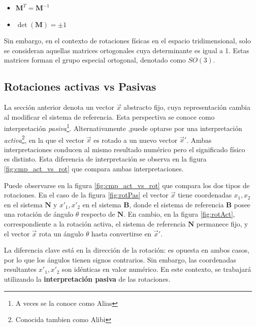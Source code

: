 \begin{itemize}
	\item $\mathbf{M}^T = \mathbf{M}^{-1}$
	\item $\det( \mathbf{M}) = \pm 1$ 
\end{itemize}
Sin embargo, en el contexto de rotaciones físicas en el espacio tridimensional, solo se consideran aquellas matrices ortogonales cuya determinante es igual a 1. Estas matrices forman el grupo especial ortogonal, denotado como $SO(3)$. 

\subsection{Rotaciones activas vs Pasivas}
La sección anterior denota un vector $\vec{x}$ abstracto fijo,  cuya representación cambia al modificar el sistema de referencia. Esta perspectiva se conoce como interpretación \textit{pasiva}\footnote{A veces se la conoce como Alias}. Alternativamente ,puede optarse por una interpretación  \textit{activa}\footnote{Conocida tambien como Alibi}, 
en la que el vector $\vec{x}$ es rotado a un nuevo vector $\vec{x}'$. Ambas interpretaciones conducen al mismo resultado numérico pero el significado físico es distinto. Esta diferencia de interpretación se observa en la figura \ref{fig:cmp_act_vs_rot} que compara ambas interpretaciones. 

Puede observarse en la figura \ref{fig:cmp_act_vs_rot} que compara los dos tipos de  rotaciones. En el caso de la figura \ref{fig:rotPas} el vector $\vec{x}$ tiene coordenadas $x_1,x_2$ en el sistema $\textbf{N}$ y $x'_1,x'_2$ en el sistema $\textbf{B}$, donde el sistema de referencia $\textbf{B}$  posee una rotación de ángulo $\theta$ respecto de $\textbf{N}$.  En cambio, en la figura \ref{fig:rotAct}, correspondiente a la rotación activa, el sistema de referencia $\textbf{N}$ permanece fijo, y el vector $\vec{x}$ rota un ángulo $\theta$ hasta convertirse en $\vec{x}'$.

La diferencia clave está en la dirección de la rotación: es opuesta en ambos casos, por lo que los ángulos tienen signos contrarios. Sin embargo, las coordenadas resultantes ${x'_1, x'_2}$ son idénticas en valor numérico. En este contexto, se trabajará utilizando la \textbf{interpretación pasiva} de las rotaciones.



